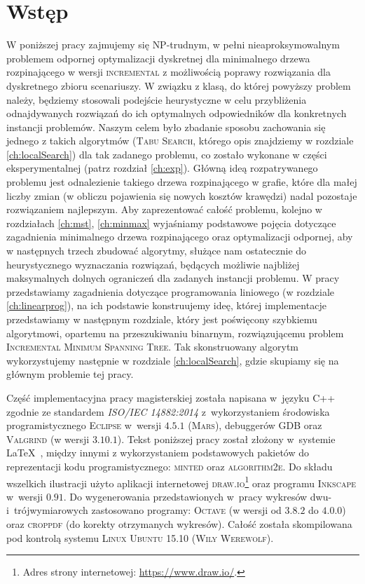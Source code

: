\chapter{Wstęp}
\thispagestyle{chapterBeginStyle}

W poniższej pracy zajmujemy się \textsc{NP}-trudnym, w pełni nieaproksymowalnym~\cite[$6$]{Kasperski2014} problemem odpornej optymalizacji dyskretnej dla minimalnego drzewa rozpinającego w wersji \textsc{incremental} z możliwością poprawy rozwiązania dla dyskretnego zbioru scenariuszy. W związku z klasą, do której powyższy problem należy, będziemy stosowali podejście heurystyczne w celu przybliżenia odnajdywanych rozwiązań do ich optymalnych odpowiedników dla konkretnych instancji problemów. Naszym celem było zbadanie sposobu zachowania się jednego z takich algorytmów (\textsc{Tabu Search}, którego opis znajdziemy w rozdziale \ref{ch:localSearch}) dla tak zadanego problemu, co zostało wykonane w części eksperymentalnej (patrz rozdział \ref{ch:exp}). Główną ideą rozpatrywanego problemu jest odnalezienie takiego drzewa rozpinającego w grafie, które dla małej liczby zmian (w obliczu pojawienia się nowych kosztów krawędzi) nadal pozostaje rozwiązaniem najlepszym. Aby zaprezentować całość problemu, kolejno w rozdziałach \ref{ch:mst}, \ref{ch:minmax} wyjaśniamy podstawowe pojęcia dotyczące zagadnienia minimalnego drzewa rozpinającego oraz optymalizacji odpornej, aby w następnych trzech zbudować algorytmy, służące nam ostatecznie do heurystycznego wyznaczania rozwiązań, będących możliwie najbliżej maksymalnych dolnych ograniczeń dla zadanych instancji problemu. W pracy przedstawiamy zagadnienia dotyczące programowania liniowego (w rozdziale \ref{ch:linearprog}), na ich podstawie konstruujemy ideę, której implementacje przedstawiamy w następnym rozdziale, który jest poświęcony szybkiemu algorytmowi, opartemu na przeszukiwaniu binarnym, rozwiązującemu problem \textsc{Incremental Minimum Spanning Tree}. Tak skonstruowany algorytm wykorzystujemy następnie w rozdziale \ref{ch:localSearch}, gdzie skupiamy się na głównym problemie tej pracy.

Część implementacyjna pracy magisterskiej została napisana w~języku \textsf{C++} zgodnie ze standardem \textit{\textsc{ISO/IEC 14882:2014}} z~wykorzystaniem środowiska programistycznego \textsc{Eclipse} w~wersji \textsc{$4.5.1$} (\textsc{Mars}), debuggerów \textsc{GDB} oraz \textsc{Valgrind} (w wersji \textsc{$3.10.1$}).
Tekst poniższej pracy został złożony w~systemie \LaTeX~, między innymi z wykorzystaniem podstawowych pakietów do reprezentacji kodu programistycznego: \textsc{minted} oraz \textsc{algorithm2e}.
Do składu wszelkich ilustracji użyto aplikacji internetowej \textsc{draw.io}\footnote{
	Adres strony internetowej: \url{https://www.draw.io/}.
} oraz programu \textsc{Inkscape} w~wersji \textsc{$0.91$}.
Do wygenerowania przedstawionych w~pracy wykresów dwu- i~trójwymiarowych zastosowano programy: \textsc{Octave} (w wersji od \textsc{$3.8.2$} do \textsc{$4.0.0$}) oraz \textsc{croppdf} (do korekty otrzymanych wykresów).
Całość została skompilowana pod kontrolą systemu \textsc{Linux Ubuntu 15.10 (Wily Werewolf)}.